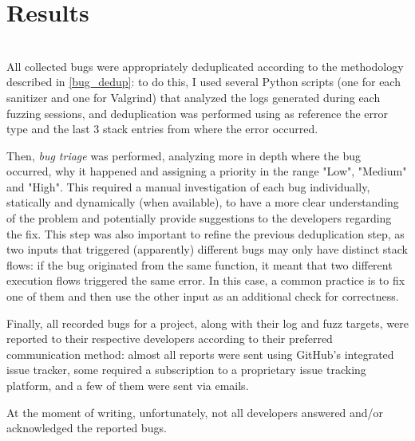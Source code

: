 \chapter{Results} \label{chap_4}
\ \\
All collected bugs were appropriately deduplicated according to the methodology described in \ref{bug_dedup}: to do this, I used several Python scripts (one for each sanitizer and one for Valgrind) that analyzed the logs generated during each fuzzing sessions, and deduplication was performed using as reference the error type and the last 3 stack entries from where the error occurred.

Then, \textit{bug triage} was performed, analyzing more in depth where the bug occurred, why it happened and assigning a priority in the range "Low", "Medium" and "High". This required a manual investigation of each bug individually, statically and dynamically (when available), to have a more clear understanding of the problem and potentially provide suggestions to the developers regarding the fix.
This step was also important to refine the previous deduplication step, as two inputs that triggered (apparently) different bugs may only have distinct stack flows: if the bug originated from the same function, it meant that two different execution flows triggered the same error. In this case, a common practice is to fix one of them and then use the other input as an additional check for correctness.

Finally, all recorded bugs for a project, along with their log and fuzz targets, were reported to their respective developers according to their preferred communication method: almost all reports were sent using GitHub's integrated issue tracker, some required a subscription to a proprietary issue tracking platform, and a few of them were sent via emails.

At the moment of writing, unfortunately, not all developers answered and/or acknowledged the reported bugs.



\newpage
